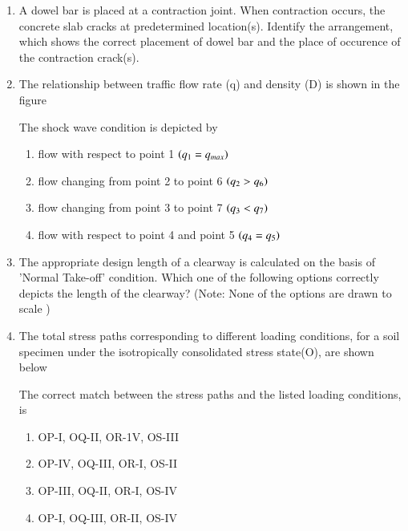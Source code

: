 \documentclass[journal,12pt,onecolumn]{IEEEtran}
\theoremstyle{remark}
\begin{document}
\begin{enumerate}
\item A dowel bar is placed at a contraction joint. When contraction occurs, the concrete slab cracks at predetermined location(s). Identify the arrangement, which shows the correct placement of dowel bar and the place of occurence of the contraction crack(s).






\item The relationship between traffic flow rate (q) and density (D) is shown in the figure
	\begin{center}

	\end{center}

The shock wave condition is depicted by 
\begin{enumerate}
\item flow with respect to point 1 $\left(q_{1} = q_{max}\right)$
\item flow changing from point 2 to point 6 $\left(q_{2} > q_{6}\right)$
\item flow changing from point 3 to point 7 $\left(q_{3} < q_{7}\right)$
\item flow with respect to point 4 and point 5 $\left(q_{4} = q_{5}\right)$
\end{enumerate}

\item The appropriate design length of a clearway is calculated on the basis of 'Normal Take-off' condition. Which one of the following options correctly depicts the length of the clearway? (Note: None of the options are drawn to scale )
	\begin{center}

	\end{center}

\item The total stress paths corresponding to different loading conditions, for a soil specimen under the isotropically consolidated stress state(O), are shown below 








The correct match between the stress paths and the listed loading conditions, is 
\begin{enumerate}

\item OP-I, OQ-II, OR-1V, OS-III
\item OP-IV, OQ-III, OR-I, OS-II
\item OP-III, OQ-II, OR-I, OS-IV
\item OP-I, OQ-III, OR-II, OS-IV


\end{enumerate}
\end{enumerate}
\end{document}
